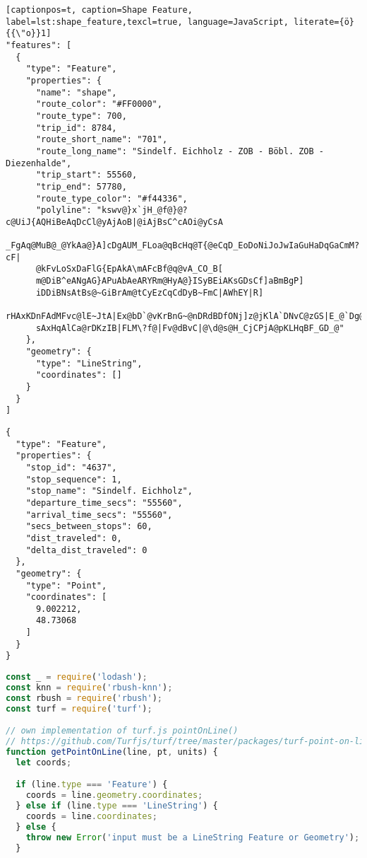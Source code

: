 \begin{newpage}
\begin{lstlisting}[captionpos=t, caption=Shape Feature, label=lst:shape_feature,texcl=true, language=JavaScript, literate={ö}{{\"o}}1]
"features": [
  {
    "type": "Feature",
    "properties": {
      "name": "shape",
      "route_color": "#FF0000",
      "route_type": 700,
      "trip_id": 8784,
      "route_short_name": "701",
      "route_long_name": "Sindelf. Eichholz - ZOB - Böbl. ZOB - Diezenhalde",
      "trip_start": 55560,
      "trip_end": 57780,
      "route_type_color": "#f44336",
      "polyline": "kswv@}x`jH_@f@}@?c@UiJ{AQHiBeAqDcCl@yAjAoB|@iAjBsC^cAOi@yCsA
      _FgAq@MuB@_@YkAa@}A]cDgAUM_FLoa@qBcHq@T{@eCqD_EoDoNiJoJwIaGuHaDqGaCmM?cF|
      @kFvLoSxDaFlG{EpAkA\mAFcBf@q@vA_CO_B[
      m@DiB^eANgAG}APuAbAeARYRm@HyA@}ISyBEiAKsGDsCf]aBmBgP]
      iDDiBNsAtBs@~GiBrAm@tCyEzCqCdDyB~FmC|AWhEY|R]
      rHAxKDnFAdMFvc@lE~JtA|Ex@bD`@vKrBnG~@nDRdBDfONj]z@jKlA`DNvC@zGS|E_@`Dg@zF
      sAxHqAlCa@rDKzIB|FLM\?f@|Fv@dBvC|@\d@s@H_CjCPjA@pKLHqBF_GD_@"
    },
    "geometry": {
      "type": "LineString",
      "coordinates": []
    }
  }
]  
\end{lstlisting}

\begin{lstlisting}[captionpos=t, caption=Station Feature, label=lst:station_feature]
{
  "type": "Feature",
  "properties": {
    "stop_id": "4637",
    "stop_sequence": 1,
    "stop_name": "Sindelf. Eichholz",
    "departure_time_secs": "55560",
    "arrival_time_secs": "55560",
    "secs_between_stops": 60,
    "dist_traveled": 0,
    "delta_dist_traveled": 0
  },
  "geometry": {
    "type": "Point",
    "coordinates": [
      9.002212,
      48.73068
    ]
  }
}
\end{lstlisting}

\begin{lstlisting}[captionpos=t, caption=Station Matching, label=lst:match_station, language=JavaScript]
const _ = require('lodash');
const knn = require('rbush-knn');
const rbush = require('rbush');
const turf = require('turf');

// own implementation of turf.js pointOnLine()
// https://github.com/Turfjs/turf/tree/master/packages/turf-point-on-line
function getPointOnLine(line, pt, units) {
  let coords;

  if (line.type === 'Feature') {
    coords = line.geometry.coordinates;
  } else if (line.type === 'LineString') {
    coords = line.coordinates;
  } else {
    throw new Error('input must be a LineString Feature or Geometry');
  }


\end{lstlisting}
\end{newpage}
